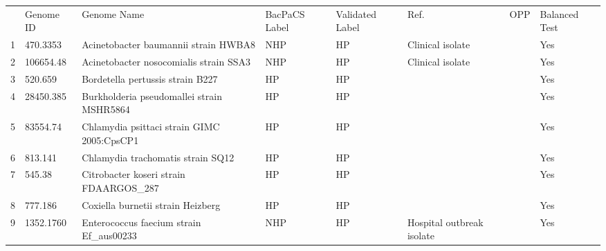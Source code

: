 
\begin{tabular}
{} &   Genome ID &                                                       Genome Name & BacPaCS Label & Validated Label &                                    Ref. &                                 OPP & Balanced Test \\

1   &    470.3353 &                              Acinetobacter baumannii strain HWBA8 &           NHP &              HP &                         Clinical isolate \cite{yoon2017bla} &    \cite{peleg2008acinetobacter} &           Yes \\
2   &   106654.48 &                            Acinetobacter nosocomialis strain SSA3 &           NHP &              HP &                         Clinical isolate \cite{yoon2017bla} &    \cite{peleg2008acinetobacter} &           Yes \\
3   &     520.659 &                                  Bordetella pertussis strain B227 &            HP &              HP &                                       \cite{bowden2016genome} &                                  &           Yes \\
4   &   28450.385 &                         Burkholderia pseudomallei strain MSHR5864 &            HP &              HP &                                    \cite{sarovich2018raising} &       \cite{mangalea2017nitrate} &           Yes \\
5   &    83554.74 &                        Chlamydia psittaci strain GIMC 2005:CpsCP1 &            HP &              HP &                                      \cite{feodorova2020data} &                                  &           Yes \\
6   &     813.141 &                                 Chlamydia trachomatis strain SQ12 &            HP &              HP &                              \cite{suchland2017demonstration} &                                  &           Yes \\
7   &      545.38 &                           Citrobacter koseri strain FDAARGOS\_287 &            HP &              HP &                                                 \cite{545.38,yuan2019comparative} &       \cite{yuan2019comparative} &           Yes \\
8   &     777.186 &                                 Coxiella burnetii strain Heizberg &            HP &              HP &                                        \cite{kuley2017genome} &                                  &           Yes \\
9   &   1352.1760 &                          Enterococcus faecium strain Ef\_aus00233 &           NHP &              HP &  Hospital outbreak isolate \cite{buultjens2017evolutionary} &      \cite{zhou2020enterococcus} &           Yes \\

\end{tabular}
